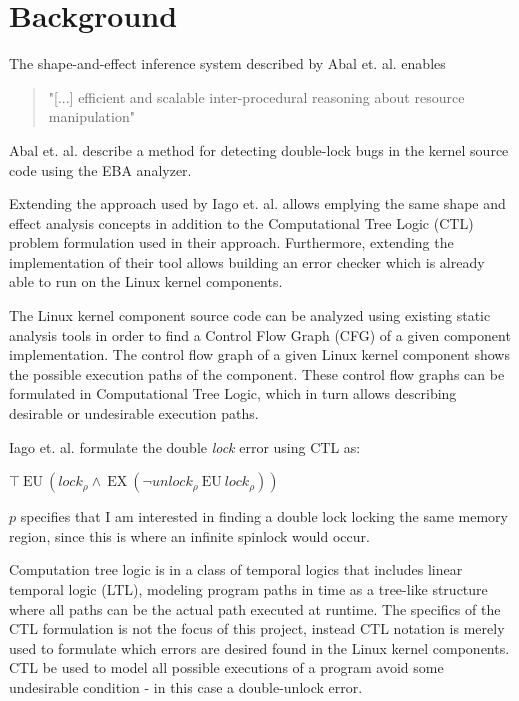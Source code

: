 \section{Background}

The shape-and-effect inference system described by Abal et. al. \cite{Abal2017EffectiveBF} enables \begin{quote}
    "[...] efficient and scalable inter-procedural reasoning about resource manipulation"
\end{quote}
 
\newpar Abal et. al. describe a method for detecting double-lock bugs in the kernel source code using the EBA analyzer.

\newpar Extending the approach used by Iago et. al. allows emplying the same shape and effect analysis concepts in addition to the Computational Tree Logic (CTL) problem formulation used in their approach. Furthermore, extending the implementation of their tool allows building an error checker which is already able to run on the Linux kernel components.

\newpar The Linux kernel component source code can be analyzed using existing static analysis tools in order to find a Control Flow Graph (CFG) of a given component implementation. The control flow graph of a given Linux kernel component shows the possible execution paths of the component. These control flow graphs can be formulated in Computational Tree Logic, which in turn allows describing desirable or undesirable execution paths. 

\newpar Iago et. al. formulate the double \textit{lock} error using CTL as: 

\begin{center}
    $\top\:\mathrm{EU}\:\left({l o c k}_{\rho} \wedge\:\mathrm{EX}\:\left(\neg {u n l o c k}_{\rho}\:\mathrm{EU}\:{l o c k}_{\rho}\right)\right)$
\end{center}

\newpar $p$ specifies that I am interested in finding a double lock locking the same memory region, since this is where an infinite spinlock would occur. 

\newpar Computation tree logic is in a class of temporal logics that includes linear temporal logic (LTL), modeling program paths in time as a tree-like structure where all paths can be the actual path executed at runtime. The specifics of the CTL formulation is not the focus of this project, instead CTL notation is merely used to formulate which errors are desired found in the Linux kernel components. CTL be used to model all possible executions of a program avoid some undesirable condition - in this case a double-unlock error.

